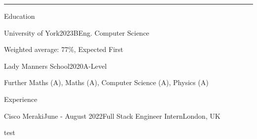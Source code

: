 \documentclass{structure} %
\begin{document}
\smallskip
\hrule %
\smallskip

\begin{rSection}{Education}

\begin{rSubsection}{University of York}{2023}{BEng. Computer Science}{}{}
    \item Weighted average: 77\%, Expected First
\end{rSubsection}

\begin{rSubsection}{Lady Manners School}{2020}{A-Level}{}{}
    \item Further Maths (A), Maths (A), Computer Science (A), Physics (A)
\end{rSubsection}
\end{rSection}


\begin{rSection}{Experience}

\begin{rSubsection}{Cisco Meraki}{June - August 2022}{Full Stack Engineer Intern}{London, UK}{}
   \item test 
\end{rSubsection}

\end{rSection}


\end{document}
